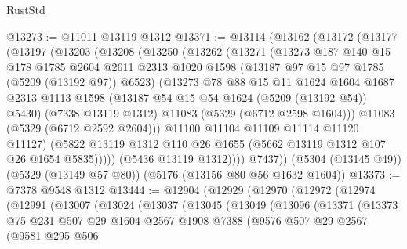 \begin{lexlean}{RustStd}
\begin{coremodule}
@13273 := @11011 @13119 @1312
@13371 := @13114
    (@13162
      (@13172
        (@13177
          (@13197
            (@13203
              (@13208
                (@13250
                  (@13262
                    (@13271
                      (@13273
                        @187
                        @140
                        @15
                        @178
                        @1785
                        @2604
                        @2611
                        @2313
                        @1020
                        @1598
                        (@13187 @97 @15 @97 @1785 (@5209 (@13192 @97)) @6523)
                        (@13273
                          @78
                          @88
                          @15
                          @11
                          @1624
                          @1604
                          @1687
                          @2313
                          @1113
                          @1598
                          (@13187 @54 @15 @54 @1624 (@5209 (@13192 @54)) @5430)
                          (@7338 @13119 @1312)
                          @11083
                          (@5329 (@6712 @2598 @1604)))
                        @11083
                        (@5329 (@6712 @2592 @2604)))
                      @11100
                      @11104
                      @11109
                      @11114
                      @11120
                      @11127)
                    (@5822 @13119 @1312 @110 @26 @1655 (@5662 @13119 @1312 @107 @26 @1654 @5835)))))
              (@5436 @13119 @1312))))
        @7437))
    (@5304 (@13145 @49))
    (@5329 (@13149 @57 @80))
    (@5176 (@13156 @80 @56 @1632 @1604))
@13373 := @7378 @9548 @1312
@13444 := @12904
    (@12929
      (@12970
        (@12972
          (@12974
            (@12991
              (@13007
                (@13024
                  (@13037
                    (@13045
                      (@13049
                        (@13096
                          (@13371
                            (@13373
                              @75
                              @231
                              @507
                              @29
                              @1604
                              @2567
                              @1908
                              @7388
                              (@9576
                                @507
                                @29
                                @2567
                                (@9581
                                  @295
                                  @506

\end{coremodule}
\end{lexlean}
